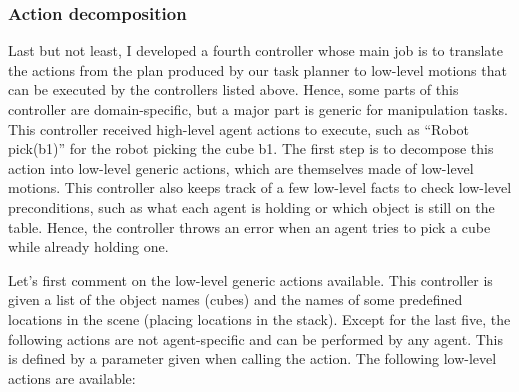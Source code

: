\subsubsection{Action decomposition}

Last but not least, I developed a fourth controller whose main job is to translate the actions from the plan produced by our task planner to low-level motions that can be executed by the controllers listed above. Hence, some parts of this controller are domain-specific, but a major part is generic for manipulation tasks. This controller received high-level agent actions to execute, such as ``Robot pick(b1)'' for the robot picking the cube b1. The first step is to decompose this action into low-level generic actions, which are themselves made of low-level motions. This controller also keeps track of a few low-level facts to check low-level preconditions, such as what each agent is holding or which object is still on the table. Hence, the controller throws an error when an agent tries to pick a cube while already holding one.

Let's first comment on the low-level generic actions available. This controller is given a list of the object names (cubes) and the names of some predefined locations in the scene (placing locations in the stack). Except for the last five, the following actions are not agent-specific and can be performed by any agent. This is defined by a parameter given when calling the action. The following low-level actions are available:

